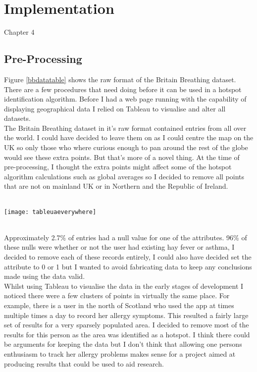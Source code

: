 \chapter{Implementation}
\label{cha:impl}

Chapter 4

\section{Pre-Processing}

Figure \ref{bbdatatable} shows the raw format of the Britain Breathing dataset. There are a few procedures that need doing before it can be used in a hotspot identification algorithm. Before I had a web page running with the capability of displaying geographical data I relied on Tableau to visualise and alter all datasets.\\ 

The Britain Breathing dataset in it's raw format contained entries from all over the world. I could have decided to leave them on as I could centre the map on the UK so only those who where curious enough to pan around the rest of the globe would see these extra points. But that's more of a novel thing. At the time of pre-processing, I thought the extra points might affect some of the hotspot algorithm calculations such as global averages so I decided to remove all points that are not on mainland UK or in Northern and the Republic of Ireland.\\

\begin{SCfigure}
\label{fig:RTv1}
\caption{Figure \ref{fig:RTv1} : Britain Breathing dataset before processing}\\
\centering
\texttt{[image: tableuaeverywhere]}
\centering
\end{SCfigure}\\

Approximately 2.7\% of entries had a null value for one of the attributes. 96\% of these nulls were  whether or not the user had existing hay fever or asthma, I decided to remove each of these records entirely, I could also have decided set the attribute to 0 or 1 but I wanted to avoid fabricating data to keep any conclusions made using the data valid.\\

Whilst using Tableau to visualise the data in the early stages of development I noticed there were a few clusters of points in virtually the same place. For example, there is a user in the north of Scotland who used the app at times multiple times a day to record her allergy symptoms. This resulted a fairly large set of results for a very sparsely populated area. I decided to remove most of the results for this person as the area was identified as a hotspot. I think there could be arguments for keeping the data but I don't think that allowing one persons enthusiasm to track her allergy problems makes sense for a project aimed at producing results that could be used to aid research.\\


